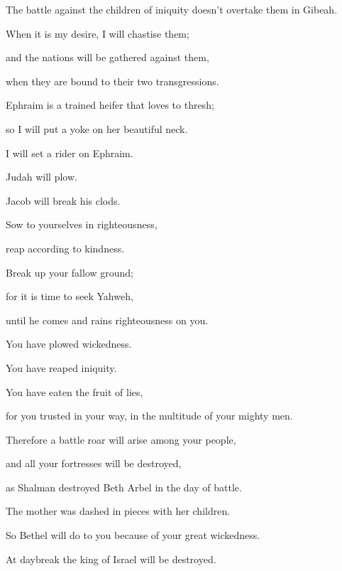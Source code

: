 {\par }{\QB The battle against the children of iniquity doesn’t overtake them in Gibeah.
\par }{\Q {}When it is my desire, I will chastise them;
\par }{\QB and the nations will be gathered against them,
\par }{\QB when they are bound to their two transgressions.
\par }{\Q {}Ephraim is a trained heifer that loves to thresh;
\par }{\QB so I will put a yoke on her beautiful neck.
\par }{\QB I will set a rider on Ephraim.
\par }{\QB Judah will plow.
\par }{\QB Jacob will break his clods.
\par }{\Q {}Sow to yourselves in righteousness,
\par }{\QB reap according to kindness.
\par }{\Q Break up your fallow ground;
\par }{\QB for it is time to seek Yahweh,
\par }{\QB until he comes and rains righteousness on you.
\par }{\Q {}You have plowed wickedness.
\par }{\QB You have reaped iniquity.
\par }{\QB You have eaten the fruit of lies,
\par }{\QB for you trusted in your way, in the multitude of your mighty men.
\par }{\Q {}Therefore a battle roar will arise among your people,
\par }{\QB and all your fortresses will be destroyed,
\par }{\QB as Shalman destroyed Beth Arbel in the day of battle.
\par }{\QB The mother was dashed in pieces with her children.
\par }{\Q {}So Bethel will do to you because of your great wickedness.
\par }{\QB At daybreak the king of Israel will be destroyed.
\par }{\BB \par }
